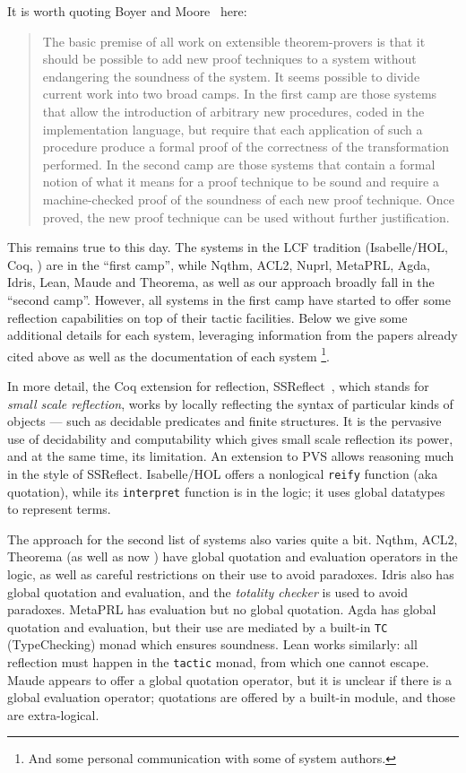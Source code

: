 \documentclass[fleqn]{llncs}
\begin{document}
It is worth quoting Boyer and Moore~\cite{BoyerMoore81} here:
\begin{quote}
The basic premise of all work on extensible
theorem-provers is that it should be possible to add new proof
techniques to a system without endangering the soundness of the system.
It seems possible to divide current work into two broad camps. In the
first camp are those systems that allow the introduction of arbitrary
new procedures, coded in the implementation language, but require that
each application of such a procedure produce a formal proof of the
correctness of the transformation performed. In the second camp are
those systems that contain a formal notion of what it means for a proof
technique to be sound and require a machine-checked proof of the
soundness of each new proof technique. Once proved, the new proof
technique can be used without further justification. 
\end{quote}
This remains true to this day. The systems in the LCF tradition (Isabelle/HOL,
Coq, \HL) are in the ``first camp'',
while Nqthm, ACL2, Nuprl, MetaPRL, Agda, Idris, Lean, Maude and Theorema, 
as well as our approach broadly fall in the ``second camp''. However,
all systems in the first camp have started to offer some reflection
capabilities on top of their tactic facilities. Below we give some 
additional details for each system, leveraging information from the papers 
already cited above as well as the documentation of each system%
\footnote{And some personal communication with some of system authors.}.

In more detail, the Coq extension for reflection,
\textrm{SSReflect}~\cite{gonthier2010introduction}, which stands for
\emph{small scale reflection}, works by locally reflecting the
syntax of particular kinds of objects --- such as decidable predicates
and finite structures.  It is the pervasive use of decidability and
computability which gives small scale reflection its power, and at the
same time, its limitation.  An extension to PVS allows reasoning much
in the style of \textrm{SSReflect}.  Isabelle/HOL offers a nonlogical
\texttt{reify} function (aka quotation), while its \texttt{interpret}
function is in the logic; it uses global datatypes to represent {\HL}
terms.

The approach for the second list of systems also varies quite a bit.
Nqthm, ACL2, Theorema (as well as now \HLQE) have global quotation
and evaluation operators in the logic, as well as careful restrictions
on their use to avoid paradoxes. Idris also has global quotation and
evaluation, and the \emph{totality checker} is used to avoid
paradoxes. MetaPRL has evaluation but no global quotation. Agda
has global quotation and evaluation, but their use are mediated by
a built-in \texttt{TC} (TypeChecking) monad which ensures soundness.
Lean works similarly: all reflection must happen in the \texttt{tactic}
monad, from which one cannot escape. Maude appears to offer a global
quotation operator, but it is unclear if there is a global evaluation
operator; quotations are offered by a built-in module, and those are
extra-logical.
\end{document}
